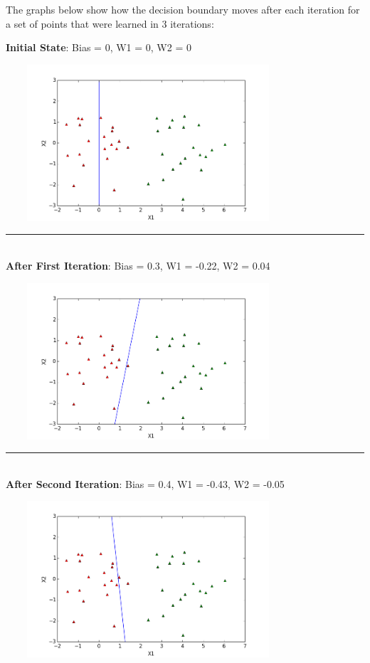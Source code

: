 \documentclass{article}
\begin{document}
\noindent The graphs below show how the decision boundary moves after each iteration for a set of points that were learned in 3 iterations: \\
\begin{center}
\textbf{Initial State}: Bias = 0, W1 = 0, W2 = 0 \\
\centerline{\includegraphics[width=400px, height=220px]{partA2_iter0}}
\vspace{2mm}
\rule{8cm}{0.4pt} \\
\vspace{2mm}
\textbf{After First Iteration}: Bias = 0.3, W1 = -0.22, W2 = 0.04 \\
\centerline{\includegraphics[width=400px, height=220px]{partA2_iter1}}
\vspace{2mm}
\rule{8cm}{0.4pt} \\
\vspace{2mm}
\textbf{After Second Iteration}: Bias = 0.4, W1 = -0.43, W2 = -0.05 \\
\centerline{\includegraphics[width=400px, height=220px]{partA2_iter2}}

\end{center}
\end{document}
